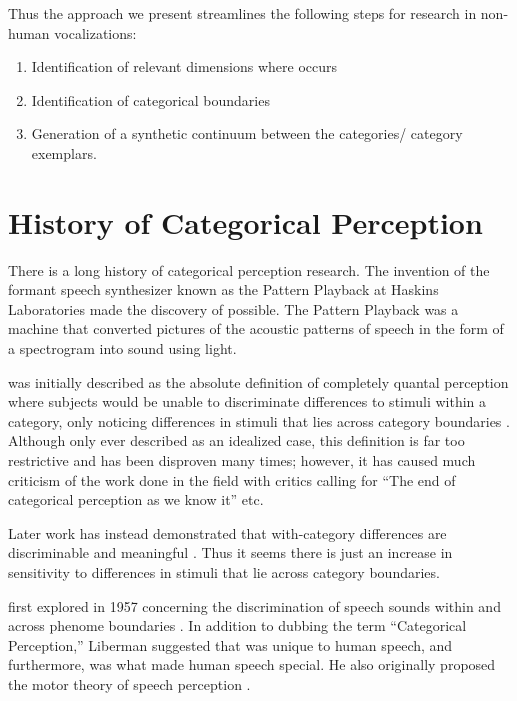 Thus the approach we present streamlines the following steps for \CP research in non-human vocalizations:
\begin{enumerate}
    \item Identification of relevant dimensions where \CP occurs
    \item Identification of categorical boundaries
    \item Generation of a synthetic continuum between the categories/ category exemplars.
\end{enumerate}

\section{History of Categorical Perception}

There is a long history of categorical perception research.
The invention of the formant speech synthesizer known as the Pattern Playback at Haskins Laboratories \cite{patternplayback} made the discovery of \CP possible.
The Pattern Playback was a machine that converted pictures of the acoustic patterns of speech in the form of a spectrogram into sound using light.

\CP was initially described as the absolute definition of completely quantal perception where subjects would be unable to discriminate differences to stimuli within a category, only noticing differences in stimuli that lies across category boundaries \cite{liberman1957discrimination, Studdert1970motor}. Although only ever described as an idealized case, this definition is far too restrictive and has been disproven many times; however, it has caused much criticism of the work done in the \CP field with critics calling for ``The end of categorical perception as we know it'' \cite{schouten2003end} etc.

Later work has instead demonstrated that with-category differences are discriminable \cite{pisoni1974reaction,carney1977noncategorical,massaro1983categorical} and meaningful \cite{miller1997internal,mcmurray2002gradient,mcmurray2008gradient}. Thus it seems there is just an increase in sensitivity to differences in stimuli that lie across category boundaries.

\CP first explored in 1957 concerning the discrimination of speech sounds within and across phenome boundaries \cite{liberman1957discrimination}.  In addition to dubbing the term ``Categorical Perception,'' Liberman suggested that \CP was unique to human speech, and furthermore, was what made human speech special. He also originally proposed the motor theory of speech perception \cite{liberman1967perception}.

